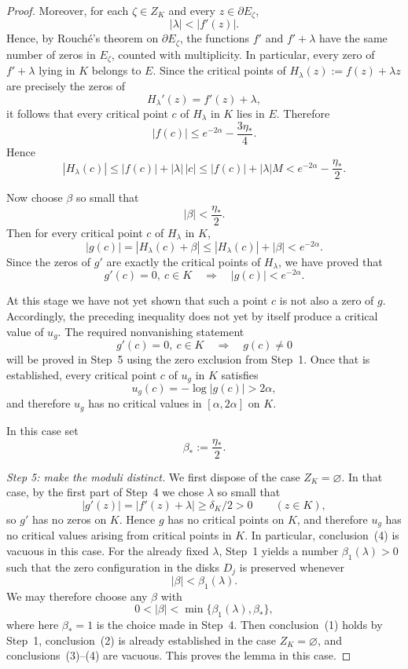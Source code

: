 \documentclass[12pt]{amsart}
\theoremstyle{definition}
\theoremstyle{remark}
\begin{document}
\begin{proof}
Moreover, for each $\zeta\in Z_K$ and every $z\in \partial E_\zeta$,
\[
|\lambda|<|f'(z)|.
\]
Hence, by Rouch\'e's theorem on $\partial E_\zeta$, the functions $f'$ and $f'+\lambda$
have the same number of zeros in $E_\zeta$, counted with multiplicity. In particular,
every zero of $f'+\lambda$ lying in $K$ belongs to $E$. Since the critical points of
$H_\lambda(z):=f(z)+\lambda z$ are precisely the zeros of
\[
H_\lambda'(z)=f'(z)+\lambda,
\]
it follows that every critical point $c$ of $H_\lambda$ in $K$ lies in $E$. Therefore
\[
|f(c)|\le e^{-2\alpha}-\frac{3\eta_*}{4}.
\]
Hence
\[
|H_\lambda(c)|
\le |f(c)|+|\lambda|\,|c|
\le |f(c)|+|\lambda|M
<
e^{-2\alpha}-\frac{\eta_*}{2}.
\]

Now choose $\beta$ so small that
\[
|\beta|<\frac{\eta_*}{2}.
\]
Then for every critical point $c$ of $H_\lambda$ in $K$,
\[
|g(c)|=|H_\lambda(c)+\beta|
\le |H_\lambda(c)|+|\beta|
<e^{-2\alpha}.
\]
Since the zeros of $g'$ are exactly the critical points of $H_\lambda$, we have proved that
\[
g'(c)=0,\ c\in K
\quad\Longrightarrow\quad
|g(c)|<e^{-2\alpha}.
\]

At this stage we have not yet shown that such a point $c$ is not also a zero of $g$.
Accordingly, the preceding inequality does not yet by itself produce a critical value of $u_g$.
The required nonvanishing statement
\[
g'(c)=0,\ c\in K
\quad\Longrightarrow\quad
g(c)\neq 0
\]
will be proved in Step~5 using the zero exclusion from Step~1. Once that is established,
every critical point $c$ of $u_g$ in $K$ satisfies
\[
u_g(c)=-\log|g(c)|>2\alpha,
\]
and therefore $u_g$ has no critical values in $[\alpha,2\alpha]$ on $K$.

In this case set
\[
\beta_*:=\frac{\eta_*}{2}.
\]

\noindent\textit{Step 5: make the moduli distinct.} We first dispose of the case $Z_K=\varnothing$.
In that case, by the first part of Step~4 we chose $\lambda$ so small that
\[
|g'(z)| = |f'(z)+\lambda| \ge \delta_K/2 > 0
\qquad (z\in K),
\]
so $g'$ has no zeros on $K$. Hence $g$ has no critical points on $K$, and therefore
$u_g$ has no critical values arising from critical points in $K$. In particular,
conclusion~(4) is vacuous in this case. For the already fixed $\lambda$, Step~1 yields a number
$\beta_1(\lambda)>0$ such that the zero configuration in the disks $D_j$ is preserved whenever
\[
|\beta|<\beta_1(\lambda).
\]
We may therefore choose any $\beta$ with
\[
0<|\beta|<\min\{\beta_1(\lambda),\beta_*\},
\]
where here $\beta_*=1$ is the choice made in Step~4. Then conclusion~(1) holds by Step~1,
conclusion~(2) is already established in the case $Z_K=\varnothing$, and conclusions~(3)--(4)
are vacuous. This proves the lemma in this case.


\end{proof}
\end{document}
